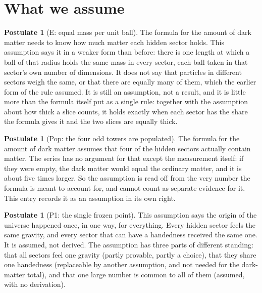 \documentclass[11pt]{article}
\theoremstyle{definition}
\newtheorem{postulate}[theorem]{Postulate}
\theoremstyle{plain}
\begin{document}
\section{What we assume}

\begin{postulate}[E: equal mass per unit ball]\label{c:dark-matter.e-equal-mass-per-unit-ball}
The formula for the amount of dark matter needs to know how much matter each hidden sector holds. This assumption says it in a weaker form than before: there is one length at which a ball of that radius holds the same mass in every sector, each ball taken in that sector's own number of dimensions. It does not say that particles in different sectors weigh the same, or that there are equally many of them, which the earlier form of the rule assumed. It is still an assumption, not a result, and it is little more than the formula itself put as a single rule: together with the assumption about how thick a slice counts, it holds exactly when each sector has the share the formula gives it and the two slices are equally thick.
\end{postulate}

\begin{postulate}[Pop: the four odd towers are populated]\label{c:dark-matter.odd-towers-populated}
The formula for the amount of dark matter assumes that four of the hidden sectors actually contain matter. The series has no argument for that except the measurement itself: if they were empty, the dark matter would equal the ordinary matter, and it is about five times larger. So the assumption is read off from the very number the formula is meant to account for, and cannot count as separate evidence for it. This entry records it as an assumption in its own right.
\end{postulate}

\begin{postulate}[P1: the single frozen point]\label{c:dark-matter.p1-single-frozen-point}
This assumption says the origin of the universe happened once, in one way, for everything. Every hidden sector feels the same gravity, and every sector that can have a handedness received the same one. It is assumed, not derived. The assumption has three parts of different standing: that all sectors feel one gravity (partly provable, partly a choice), that they share one handedness (replaceable by another assumption, and not needed for the dark-matter total), and that one large number is common to all of them (assumed, with no derivation).
\end{postulate}
\end{document}
